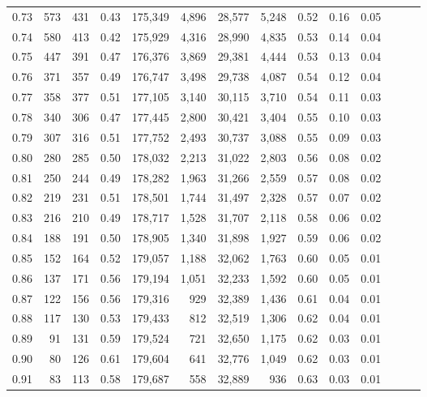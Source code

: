 \begin{tabular}{rrrrrrrrrrrrrr}
0.73 &    573 &  431 &  0.43 &  175,349 &    4,896 &  28,577 &   5,248 &  0.52 &  0.16 &      0.05 \\
0.74 &    580 &  413 &  0.42 &  175,929 &    4,316 &  28,990 &   4,835 &  0.53 &  0.14 &      0.04 \\
0.75 &    447 &  391 &  0.47 &  176,376 &    3,869 &  29,381 &   4,444 &  0.53 &  0.13 &      0.04 \\
0.76 &    371 &  357 &  0.49 &  176,747 &    3,498 &  29,738 &   4,087 &  0.54 &  0.12 &      0.04 \\
0.77 &    358 &  377 &  0.51 &  177,105 &    3,140 &  30,115 &   3,710 &  0.54 &  0.11 &      0.03 \\
0.78 &    340 &  306 &  0.47 &  177,445 &    2,800 &  30,421 &   3,404 &  0.55 &  0.10 &      0.03 \\
0.79 &    307 &  316 &  0.51 &  177,752 &    2,493 &  30,737 &   3,088 &  0.55 &  0.09 &      0.03 \\
0.80 &    280 &  285 &  0.50 &  178,032 &    2,213 &  31,022 &   2,803 &  0.56 &  0.08 &      0.02 \\
0.81 &    250 &  244 &  0.49 &  178,282 &    1,963 &  31,266 &   2,559 &  0.57 &  0.08 &      0.02 \\
0.82 &    219 &  231 &  0.51 &  178,501 &    1,744 &  31,497 &   2,328 &  0.57 &  0.07 &      0.02 \\
0.83 &    216 &  210 &  0.49 &  178,717 &    1,528 &  31,707 &   2,118 &  0.58 &  0.06 &      0.02 \\
0.84 &    188 &  191 &  0.50 &  178,905 &    1,340 &  31,898 &   1,927 &  0.59 &  0.06 &      0.02 \\
0.85 &    152 &  164 &  0.52 &  179,057 &    1,188 &  32,062 &   1,763 &  0.60 &  0.05 &      0.01 \\
0.86 &    137 &  171 &  0.56 &  179,194 &    1,051 &  32,233 &   1,592 &  0.60 &  0.05 &      0.01 \\
0.87 &    122 &  156 &  0.56 &  179,316 &      929 &  32,389 &   1,436 &  0.61 &  0.04 &      0.01 \\
0.88 &    117 &  130 &  0.53 &  179,433 &      812 &  32,519 &   1,306 &  0.62 &  0.04 &      0.01 \\
0.89 &     91 &  131 &  0.59 &  179,524 &      721 &  32,650 &   1,175 &  0.62 &  0.03 &      0.01 \\
0.90 &     80 &  126 &  0.61 &  179,604 &      641 &  32,776 &   1,049 &  0.62 &  0.03 &      0.01 \\
0.91 &     83 &  113 &  0.58 &  179,687 &      558 &  32,889 &     936 &  0.63 &  0.03 &      0.01 \\

\end{tabular}
